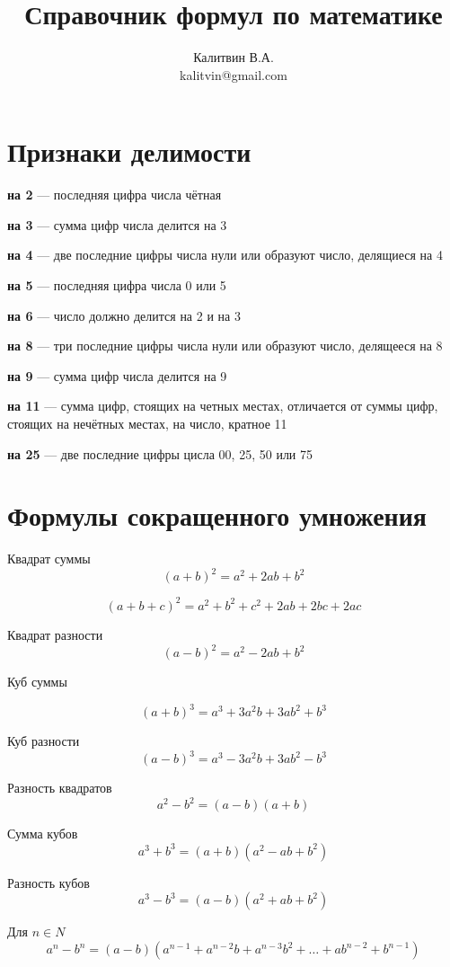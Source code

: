 \documentclass[a4paper, 12pt]{article}
\begin{document}
\author{Калитвин В.А.\\
kalitvin@gmail.com}
\title{Справочник формул по математике}
\maketitle
\thispagestyle{empty}
\newpage

\section{Признаки делимости}

\textbf{на 2} --- последняя цифра числа чётная

\textbf{на 3} --- сумма цифр числа делится на 3

\textbf{на 4} --- две последние цифры числа нули или образуют число, делящиеся на 4

\textbf{на 5} --- последняя цифра числа 0 или 5

\textbf{на 6} --- число должно делится на 2 и на 3

\textbf{на 8} --- три последние цифры числа нули или образуют число, делящееся на 8

\textbf{на 9} --- сумма цифр числа делится на 9

\textbf{на 11} --- сумма цифр, стоящих на четных местах, отличается от суммы цифр, стоящих на нечётных местах, на число, кратное 11

\textbf{на 25} --- две последние цифры цисла 00, 25, 50 или 75

\section{Формулы сокращенного умножения}

Квадрат суммы
$$ (a+b)^2=a^2+2ab+b^2$$

$$ (a+b+c)^2=a^2+b^2+c^2+2ab+2bc+2ac$$

Квадрат разности
$$(a-b)^2=a^2-2ab+b^2$$

Куб суммы

$$(a+b)^3=a^3+3a^2b+3ab^2+b^3$$

Куб разности
$$(a-b)^3=a^3-3a^2b+3ab^2-b^3$$

Разность квадратов
$$a^2-b^2=(a-b)(a+b)$$

Сумма кубов
$$a^3+b^3=(a+b)(a^2-ab+b^2)$$

Разность кубов
$$a^3-b^3=(a-b)(a^2+ab+b^2)$$

Для $n\in N$
$$a^n-b^n=(a-b)(a^{n-1}+a^{n-2}b+a^{n-3}b^2+\dots +ab^{n-2}+b^{n-1})$$
\end{document}

